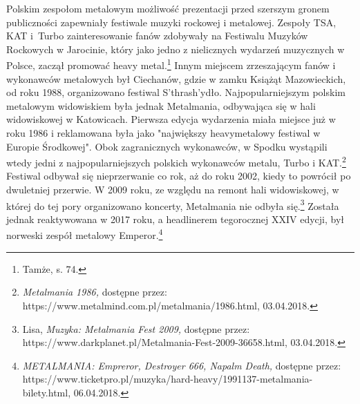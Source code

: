 \documentclass[12pt, a4paper, titlepage]{report}
\begin{document}
Polskim zespołom metalowym możliwość prezentacji przed szerszym gronem publiczności zapewniały festiwale muzyki rockowej i metalowej. Zespoły TSA, KAT i~Turbo zainteresowanie fanów zdobywały na Festiwalu Muzyków Rockowych w Jarocinie, który jako jedno z nielicznych wydarzeń muzycznych w Polsce, zaczął promować heavy metal.\footnote{Tamże, s. 74.} Innym miejscem zrzeszającym fanów i wykonawców metalowych był Ciechanów, gdzie w zamku Książąt Mazowieckich, od roku 1988, organizowano festiwal S'thrash'ydło. Najpopularniejszym polskim metalowym widowiskiem była jednak Metalmania, odbywająca się w hali widowiskowej w Katowicach. Pierwsza edycja wydarzenia miała miejsce już w roku 1986 i reklamowana była jako "największy heavymetalowy festiwal w Europie Środkowej". Obok zagranicznych wykonawców, w Spodku wystąpili wtedy jedni z najpopularniejszych polskich wykonawców metalu, Turbo i KAT.\footnote{\textit{Metalmania 1986,} dostępne przez: https://www.metalmind.com.pl/metalmania/1986.html, 03.04.2018.} Festiwal odbywał się nieprzerwanie co rok, aż do roku 2002, kiedy to powrócił po dwuletniej przerwie. W 2009 roku, ze względu na remont hali widowiskowej, w której do tej pory organizowano koncerty, Metalmania nie odbyła się.\footnote{Lisa, \textit{Muzyka: Metalmania Fest 2009,} dostępne przez: https://www.darkplanet.pl/Metalmania-Fest-2009-36658.html, 03.04.2018.} Została jednak reaktywowana w 2017 roku, a headlinerem tegorocznej XXIV edycji, był norweski zespół metalowy Emperor.\footnote{\textit{METALMANIA: Empreror, Destroyer 666, Napalm Death,} dostępne przez: https://www.ticketpro.pl/\break muzyka/hard-heavy/1991137-metalmania-bilety.html, 06.04.2018.} 
\end{document}
